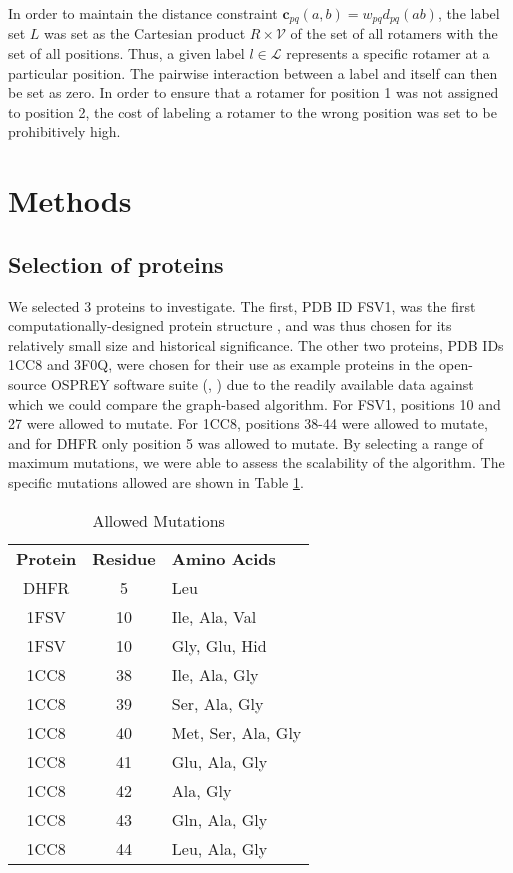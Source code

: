 \documentclass[11pt]{article}
\begin{document}
	In order to maintain the distance constraint 
	$\textbf{c}_{pq}(a,b) =  w_{pq}d_{pq}(ab)$, the label set $L$ was set as the
	Cartesian product $R \times \mathcal{V}$ of the set of all rotamers with the set
	of all positions. Thus, a given label $l \in \mathcal{L}$ represents a specific
	rotamer at a particular position. The pairwise interaction between a label and
	itself can then be set as zero. In order to ensure that a rotamer for position 1
	was not assigned to position 2, the cost of labeling a rotamer to the wrong
	position was set to be prohibitively high. 
	
	\section{Methods}
	
	\subsection{Selection of proteins}
	We selected 3 proteins to investigate. The first, PDB ID FSV1, was the first
	computationally-designed protein structure \cite{BD97}, and was thus chosen for
	its relatively small size and historical significance. The other two proteins,
	PDB IDs 1CC8 and 3F0Q, were chosen for their use as example proteins in the open-
	source OSPREY software suite (\cite{OS1}, \cite{OS2}) due to the readily 
	available data against which we could compare the graph-based algorithm. For 
	FSV1, positions 10 and 27 were allowed to mutate.  For 1CC8, positions 38-44
	were allowed to mutate, and for DHFR only position 5 was allowed to mutate. 
	By selecting a range of maximum mutations, we were able to assess the
	scalability of the algorithm. The specific mutations allowed are shown in
	Table \ref{muts}. 
	
	\begin{table}[h]
	\centering
	\caption{Allowed Mutations}
	\label{muts}
	\begin{tabular}{ccl}
	\toprule
	\textbf{Protein} & \textbf{Residue} & \textbf{Amino Acids} \\
	DHFR & 5 & Leu \\
	1FSV & 10 & Ile, Ala, Val \\
	1FSV & 10 & Gly, Glu, Hid \\
	1CC8 & 38 & Ile, Ala, Gly \\
	1CC8 & 39 & Ser, Ala, Gly \\
	1CC8 & 40 & Met, Ser, Ala, Gly \\
	1CC8 & 41 & Glu, Ala, Gly \\
	1CC8 & 42 & Ala, Gly \\
	1CC8 & 43 & Gln, Ala, Gly \\
	1CC8 & 44 & Leu, Ala, Gly \\
	\bottomrule	
	\end{tabular}
	\end{table}		
	
\end{document}
